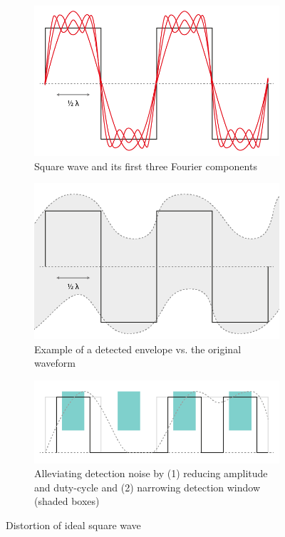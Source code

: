 \documentclass[10pt,a4paper,twocolumn]{article}
\begin{document}
\begin{figure}[t!]
    \centering
    \begin{subfigure}[t]{\columnwidth}
        \centering
        \includegraphics[width=\columnwidth]{squarewave-01.png} 
        \caption{Square wave and its first three Fourier components}
        \label{fig:squarefourier}
    \end{subfigure}%

    \begin{subfigure}[t]{\columnwidth}
        \centering
        \includegraphics[width=\columnwidth]{squarewave-02.png} 
        \caption{Example of a detected envelope vs. the original waveform}
        \label{fig:envelope}
    \end{subfigure}
    
    \begin{subfigure}[t]{\columnwidth}
        \centering
        \includegraphics[width=\columnwidth]{squarewave-03.png} 
        \caption{Alleviating detection noise by (1) reducing amplitude and duty-cycle and (2) narrowing detection window (shaded boxes)}
        \label{fig:detect}
    \end{subfigure}
    \caption{Distortion of ideal square wave }
\end{figure}
\end{document}
